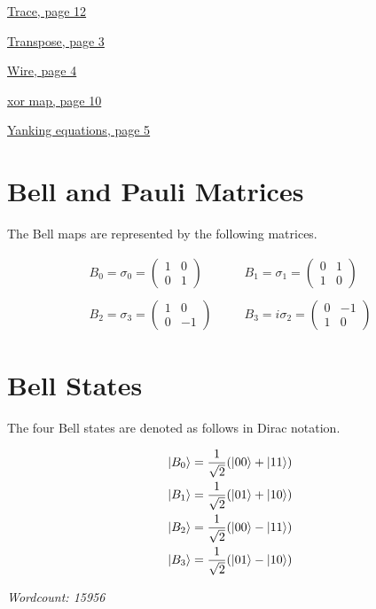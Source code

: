 \documentclass[]{article}
\begin{document}
\hyperref[discarding]{Trace, page 12}

\hyperref[braandket]{Transpose, page 3}

\hyperref[identity]{Wire, page 4}

\hyperref[xorgate]{xor map, page 10}

\hyperref[section:yankingequations]{Yanking equations, page 5}

\section{Bell and Pauli Matrices}
\label{appendix:BellMaps}


The Bell maps are represented by the following matrices.

\begin{equation}
\begin{aligned}
B_0 = \sigma_0 = 
\begin{pmatrix}
1 & 0 \\
0 & 1
\end{pmatrix}  %
~~~~&~~~~ B_1 = \sigma_1 =
\begin{pmatrix}
0 & 1 \\
1 & 0
\end{pmatrix}%
\\\\
B_2 = \sigma_3 =
\begin{pmatrix}
1 & 0 \\
0 & -1
\end{pmatrix}  %
~~~~&~~~~  B_3 = i\sigma_2 =
\begin{pmatrix}
0 & -1 \\
1 & 0
\end{pmatrix}
\end{aligned}
\end{equation}

\section{Bell States}
\label{appendix:bellstates}
The four Bell states are denoted as follows in Dirac notation.

\begin{equation}
\begin{split}
\ket{B_0} = \frac{1}{\sqrt{2}}(\ket{00} + \ket{11})\\
\ket{B_1} = \frac{1}{\sqrt{2}}(\ket{01} + \ket{10})\\
\ket{B_2} = \frac{1}{\sqrt{2}}(\ket{00} - \ket{11})\\
\ket{B_3} = \frac{1}{\sqrt{2}}(\ket{01} - \ket{10})
\end{split}
\end{equation}

\textit{Wordcount: 15956}
\end{document}
